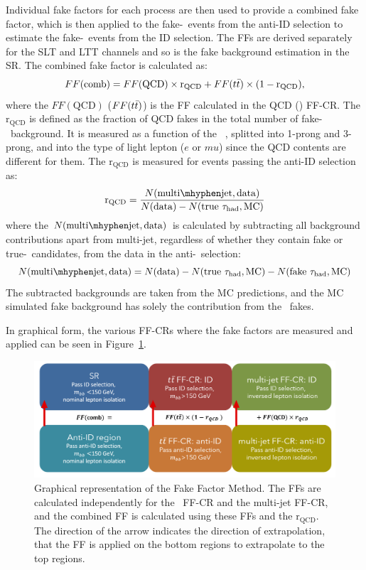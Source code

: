 Individual fake factors for each process
are then used to provide a combined fake factor,
which is then applied to the fake-\tauhad\ events 
from the anti-ID selection
to estimate the fake-\tauhad\ events from the ID selection.
The FFs are derived separately for the SLT and LTT channels and
so is the fake background estimation in the SR.
The combined fake factor is calculated as:
\begin{equation}
FF(\mathrm{comb}) = FF(\mathrm{QCD}) \times \mathrm{r}_{\mathrm{QCD}} + FF(t\bar{t}) \times (1 - \mathrm{r}_{\mathrm{QCD}}),
\end{equation} 
where the $FF(\mathrm{QCD})$ ($FF(t\bar{t})$) is the FF calculated in the QCD (\ttbar) FF-CR.
The $\mathrm{r}_{\mathrm{QCD}}$ is
defined as the fraction of QCD fakes
in the total number of fake-\tauhad\ background.
It is measured as a function of the \tauhad\ \pT, splitted 
into 1-prong and 3-prong, and into the type of light lepton ($e$ or $mu$)
since the QCD contents are different for them. 
The $\mathrm{r}_{\mathrm{QCD}}$ is measured for events passing the 
anti-ID selection as:
\begin{equation}
\mathrm{r}_{\mathrm{QCD}} = \frac{N(\mathrm{multi\mhyphen jet, data})} {N(\mathrm{data}) - N(\mathrm{true}~\tauhad, \mathrm{MC})}
\end{equation} 
where the $N(\mathrm{multi\mhyphen jet, data})$ is calculated by 
subtracting all background contributions apart from multi-jet, 
regardless of whether they contain fake or true-\tauhad\ candidates, 
from the data in the anti-\tauhad\ selection:
\begin{equation}
	N(\mathrm{multi\mhyphen jet, data}) = N(\mathrm{data}) - N(\mathrm{true}~\tauhad, \mathrm{MC}) - N(\mathrm{fake}~\tauhad, \mathrm{MC})
\end{equation}  
The subtracted backgrounds are taken from the MC predictions,
and the MC simulated fake background has solely the contribution from the
\ttbar\ fakes. 


In graphical form, the various FF-CRs 
where the fake factors are measured and applied can be seen in Figure~\ref{fig:CombFFMethod}.
\begin{figure}[htbp]
\centering
\includegraphics[width=.9\textwidth]{DiHiggs/plots/FF regions.png}
\caption{Graphical representation of the Fake Factor Method. 
The FFs are calculated independently for the \ttbar\ FF-CR and the multi-jet FF-CR, and 
the combined FF is calculated using these FFs and the $\mathrm{r}_{\mathrm{QCD}}$. 
The direction of the arrow indicates the direction 
of extrapolation, 
that the FF is applied on the bottom regions to extrapolate to the top regions.}
\label{fig:CombFFMethod}
\end{figure}



